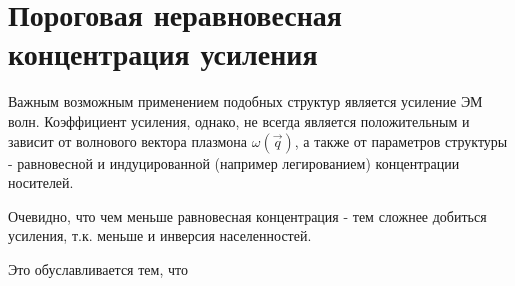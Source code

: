 \documentclass[../main.tex]{subfiles}
\begin{document}
    \section{Пороговая неравновесная концентрация усиления}

    Важным возможным применением подобных структур является усиление ЭМ волн. 
    Коэффициент усиления, однако, не всегда является положительным и 
    зависит от волнового вектора плазмона $\omega(\vec q)$, 
    а также от параметров структуры - равновесной и индуцированной 
    (например легированием) концентрации носителей. 

    Очевидно, что чем меньше равновесная концентрация - тем 
    сложнее добиться усиления, т.к. меньше и инверсия населенностей.

    Это обуславливается тем, что 
\end{document}
